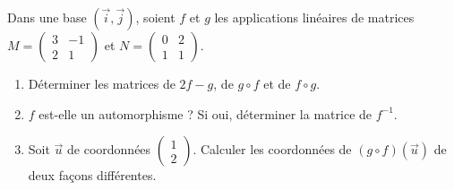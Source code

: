 \documentclass[11pt]{article}
\begin{document}
\begin{exercice}
Dans une base $(\vec{i},\vec{j})$, soient $f$ et $g$ les applications linéaires de matrices $M = \begin{pmatrix} 3 & -1 \\ 2 & 1 \end{pmatrix}$ et $N = \begin{pmatrix} 0 & 2 \\ 1 & 1 \end{pmatrix}$.
\begin{enumerate}
\item Déterminer les matrices de $2f - g$, de $g \circ f$ et de $f \circ g$.
\item $f$ est-elle un automorphisme ? Si oui, déterminer la matrice de $f^{-1}$.
\item Soit $\vec{u}$ de coordonnées $\begin{pmatrix} 1 \\ 2 \end{pmatrix}$. Calculer les coordonnées de $(g\circ f)(\vec{u})$ de deux façons différentes.
\end{enumerate}
\end{exercice}
\end{document}
